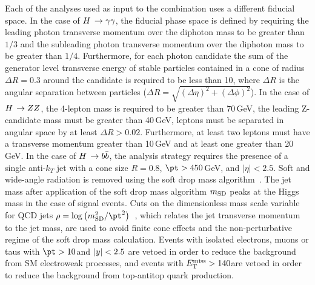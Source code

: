 Each of the analyses used as input to the combination uses a different fiducial space.
% 
% 
In the case of $H\,\to\gamma\gamma$, the fiducial phase space is defined by requiring the leading photon transverse momentum over the diphoton mass to be greater than $1/3$ and the subleading photon transverse momentum over the diphoton mass to be greater than $1/4$.
% 
Furthermore, for each photon candidate the sum of the generator level transverse energy of stable particles contained in a cone of radius $\Delta R=0.3$ around the candidate is required to be less than 10\GeV, where $\Delta R$ is the angular separation between particles ($\Delta R = \sqrt{ (\Delta\eta)^2 + (\Delta\phi)^2 }$).
% 
% 
% 
In the case of $H\,\to ZZ$, the 4-lepton mass is required to be greater than 70$\,$GeV, the leading Z-candidate mass must be greater than 40$\,$GeV, leptons must be separated in angular space by at least
$\Delta R > 0.02$.
% 
Furthermore, at least two leptons must have a transverse momentum greater than 10$\,$GeV and at least one greater than 20$\,$GeV.
% 
% 
In the case of $H\,\to b\bar{b}$, the analysis strategy requires the presence of a single anti-$k_T$ jet with a cone size $R=0.8$, $\pt>450\,$GeV, and $\left|\eta\right|<2.5$.
% 
Soft and wide-angle radiation is removed using the soft drop mass algorithm~\cite{Dasgupta:2013ihk}\cite{Larkoski:2014wba}.
% 
The jet mass after application of the soft drop mass algorithm $m_\text{SD}$ peaks at the Higgs mass in the case of signal events.
% 
Cuts on the dimensionless mass scale variable for QCD jets $\rho=\log\left(m_{\text{SD}}^2/\pt^2\right)$~\cite{Dasgupta:2013ihk}, which relates the jet transverse momentum to the jet mass, are used to avoid finite cone effects and the non-perturbative regime of the soft drop mass calculation.
% 
Events with isolated electrons, muons or taus with $\pt>10$\GeV and $\left|y\right|<2.5$ are vetoed in order to reduce the background from SM electroweak processes, and events with $E_\text{T}^\text{miss}>140$\GeV are vetoed in order to reduce the background from top-antitop quark production.



